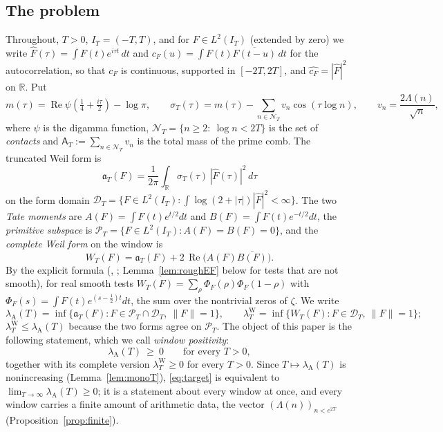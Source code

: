 \documentclass[11pt]{amsart}
\theoremstyle{definition}
\theoremstyle{remark}
\newcommand{\R}{\mathbb R}
\newcommand{\Rel}{\operatorname{Re}}
\newcommand{\PT}{\mathcal P_T}
\newcommand{\IT}{I_T}
\newcommand{\lamW}{\lambda^{\mathrm W}_T}
\newcommand{\lamA}{\lambda_{\mathrm A}(T)}
\newcommand{\sT}{\sigma_T}
\newcommand{\Fh}{\widehat F}
\newcommand{\cF}{c_F}
\newcommand{\NT}{\mathcal N_T}
\newcommand{\Aconst}{\mathsf A_T}
\begin{document}
\subsection{The problem}
Throughout, $T>0$, $\IT=(-T,T)$, and for $F\in L^2(\IT)$ (extended by zero) we write
$\Fh(\tau)=\int F(t)e^{i\tau t}\,dt$ and $\cF(u)=\int F(t)\overline{F(t-u)}\,dt$ for the
autocorrelation, so that $\cF$ is continuous, supported in $[-2T,2T]$, and
$\widehat{\cF}=|\Fh|^2$ on $\R$. Put
\begin{equation}\label{eq:symbol}
m(\tau)=\Rel\psi\!\left(\tfrac14+\tfrac{i\tau}{2}\right)-\log\pi,\qquad
\sT(\tau)=m(\tau)-\sum_{n\in\NT}v_n\cos(\tau\log n),\qquad v_n=\frac{2\Lambda(n)}{\sqrt n},
\end{equation}
where $\psi$ is the digamma function, $\NT=\{n\ge2:\ \log n<2T\}$ is the set of \emph{contacts} and
$\Aconst:=\sum_{n\in\NT}v_n$ is the total mass of the prime comb. The truncated Weil form is
\begin{equation}\label{eq:form}
\mathfrak a_T(F)=\frac1{2\pi}\int_\R\sT(\tau)\,|\Fh(\tau)|^2\,d\tau
\end{equation}
on the form domain $\mathcal D_T=\{F\in L^2(\IT):\int\log(2+|\tau|)|\Fh|^2<\infty\}$. The two \emph{Tate
moments} are $A(F)=\int F(t)e^{t/2}dt$ and $B(F)=\int F(t)e^{-t/2}dt$, the \emph{primitive subspace} is
$\PT=\{F\in L^2(\IT):A(F)=B(F)=0\}$, and the \emph{complete Weil form} on the window is
\begin{equation}\label{eq:W}
W_T(F)=\mathfrak a_T(F)+2\,\Rel\big(A(F)\overline{B(F)}\big).
\end{equation}
By the explicit formula (\cite{Weil52}, \cite[Thm.~8.4]{Paper45}; Lemma~\ref{lem:roughEF} below for
tests that are not smooth), for real smooth tests $W_T(F)=\sum_\rho\Phi_F(\rho)\Phi_F(1-\rho)$ with
$\Phi_F(s)=\int F(t)e^{(s-\frac12)t}dt$, the sum over the nontrivial zeros of $\zeta$. We write
\[
\lamA=\inf\{\mathfrak a_T(F):F\in\PT\cap\mathcal D_T,\ \|F\|=1\},\qquad
\lamW=\inf\{W_T(F):F\in\mathcal D_T,\ \|F\|=1\};
\]
$\lamW\le\lamA$ because the two forms agree on $\PT$. The object of this paper is the following
statement, which we call \emph{window positivity}:
\begin{equation}\label{eq:target}
\lamA\ \ge\ 0\qquad\text{for every }T>0 ,
\end{equation}
together with its complete version $\lamW\ge0$ for every $T>0$. Since $T\mapsto\lamA$ is nonincreasing
(Lemma~\ref{lem:monoT}), \eqref{eq:target} is equivalent to $\lim_{T\to\infty}\lamA\ge0$; it is a
statement about every window at once, and every window carries a finite amount of arithmetic data, the
vector $(\Lambda(n))_{n<e^{2T}}$ (Proposition~\ref{prop:finite}).
\end{document}
